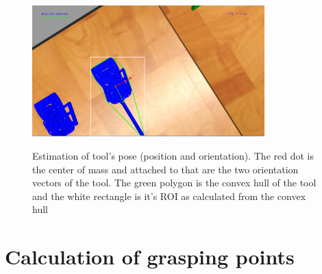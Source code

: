 \begin{center}
\begin{figure}[!htb]
\centering
\includegraphics[width=0.8\textwidth]{images/tool-pose.png}\\
\caption{Estimation of tool's pose (position and orientation). The red dot is the center of mass and attached to that are the two orientation vectors of the tool. The green polygon is the convex hull of the tool 
and the white rectangle is it's ROI as calculated from the convex hull}
\end{figure}
\end{center}

\section{Calculation of grasping points}

